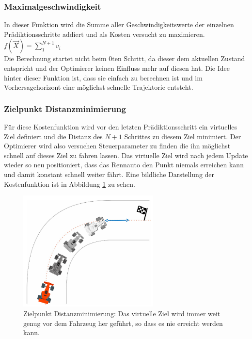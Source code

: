\documentclass{like}
\begin{document}
\subsubsection*{Maximalgeschwindigkeit}  
In dieser Funktion wird die Summe aller Geschwindigkeitswerte der einzelnen Prädiktionsschritte addiert und als Kosten versucht zu maximieren. \\
$f(\vec{X}) =  \sum_{1}^{N+1} v_i$ \\
Die Berechnung startet nicht beim $0$ten Schritt, da dieser dem aktuellen Zustand entspricht und der Optimierer keinen Einfluss mehr auf diesen hat. Die Idee hinter dieser Funktion ist, dass sie einfach zu berechnen ist und im Vorhersagehorizont eine möglichst schnelle Trajektorie entsteht.

\subsubsection*{Zielpunkt Distanzminimierung}
Für diese Kostenfunktion wird vor den letzten Prädiktionsschritt ein virtuelles Ziel definiert und die Distanz des $N+1$ Schrittes zu diesem Ziel minimiert. Der Optimierer wird also versuchen Steuerparameter zu finden die ihn möglichst schnell auf dieses Ziel zu fahren lassen. Das virtuelle Ziel wird nach jedem Update wieder so neu positioniert, dass das Rennauto den Punkt niemals erreichen kann und damit konstant schnell weiter fährt. Eine bildliche Darstellung der Kostenfunktion ist in Abbildung \ref{fig:costGoalDist} zu sehen. 

\begin{figure}[ht!]
	\centering
	\includegraphics[width=200pt]{Abbildungen/cost_goal_dist.png}
	\caption{Zielpunkt Distanzminimierung: Das virtuelle Ziel wird immer weit genug vor dem Fahrzeug her geführt, so dass es nie erreicht werden kann.}
	\label{fig:costGoalDist}
\end{figure}
\end{document}
